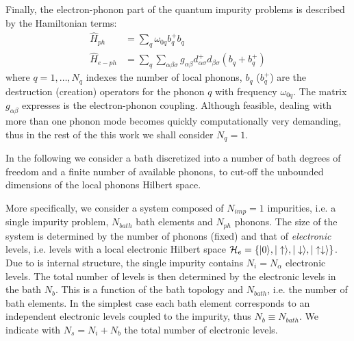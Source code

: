 \documentclass[final,3p,10pt]{elsarticle}
\newcommand{\ket}[1]
{|#1\rangle}
\def\a{\alpha}       \def\b{\beta}   \def\g{\gamma}   \def\d{\delta}
\def\up{\uparrow} \def\down{\downarrow} \def\dw{\downarrow}
\begin{document}
Finally, the electron-phonon part of the quantum impurity problems is
described by the Hamiltonian terms: 
\begin{equation}\label{Hph}
  \begin{split}
    \hat{H}_{ph}&=\sum_q \omega_{0q} b_q^+b_q\\
    \hat{H}_{e-ph} &= \sum_q\sum_{\a\b\sigma} g_{\a\b} d^+_{\a\sigma}d_{\b\sigma}(b_q+b_q^+)
\end{split}
\end{equation}
where $q=1,\dots,N_q$ indexes the number of local phonons, $b_q$
($b_q^+$) are the destruction (creation) operators for the phonon $q$
with frequency $\omega_{0q}$. The matrix  $g_{\a\b}$ expresses is the electron-phonon coupling. 
Although feasible, dealing with more than one phonon mode becomes
quickly computationally very demanding, thus in the rest of the this
work we shall consider $N_q=1$. 


In the following we consider a bath discretized into a  number
of bath degrees of freedom and a finite number of available phonons,
to cut-off the unbounded dimensions of the local phonons Hilbert space.


More specifically, we consider a system composed of $N_{imp}=1$
impurities, i.e. a single impurity problem, $N_{bath}$ bath elements
and $N_{ph}$ phonons. The size of the system is determined by
the number of phonons (fixed) and that of {\it electronic} levels, i.e. levels with a local
electronic Hilbert space
$\HH_e=\{\ket{0},\ket{\up},\ket{\dw},\ket{\up\dw} \}$. 
Due to is internal structure, the single impurity contains
$N_i= N_\a$ electronic levels.
The total number of levels is then determined by
the electronic levels in the bath $N_b$. This is a function of the bath topology and $N_{bath}$,
i.e. the number of bath elements. In the simplest case each bath
element corresponds to an independent electronic levels coupled to the
impurity, thus $N_b\equiv N_{bath}$. 
We indicate with $N_s=N_i + N_b$ the total number of electronic levels. 
\end{document}
